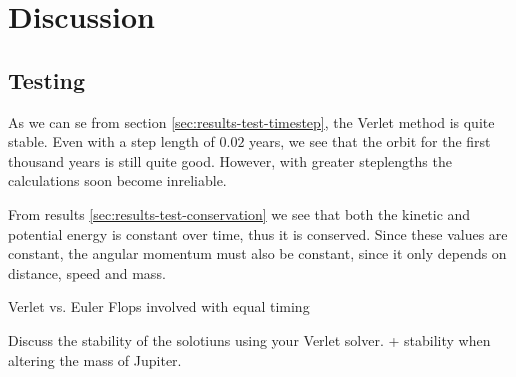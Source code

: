 \documentclass[../main.tex]{subfiles}
\begin{document}
\section{Discussion}\label{results}

\subsection{Testing}
As we can se from section \ref{sec:results-test-timestep}, the Verlet method is quite stable. Even with a step length of $0.02$ years, we see that the orbit for the first thousand years is still quite good. However, with greater steplengths the calculations soon become inreliable.

From results \ref{sec:results-test-conservation} we see that both the kinetic and potential energy is constant over time, thus it is conserved. Since these values are constant, the angular momentum must also be constant, since it only depends on distance, speed and mass.


Verlet vs. Euler
Flops involved with equal timing

Discuss the stability of the solotiuns using your Verlet solver.  + stability when altering the mass of Jupiter.
\end{document}
